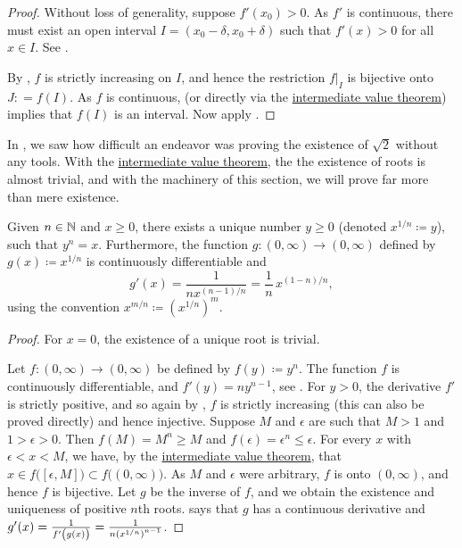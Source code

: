 \begin{proof}
Without loss of generality, suppose $f'(x_0) > 0$.  As $f'$ is
continuous, there must exist an open interval $I = (x_0-\delta,x_0+\delta)$ 
such that $f'(x) > 0$ for all $x \in I$.  See
.

By , $f$ is strictly increasing
on $I$, and hence the restriction $f|_{I}$ is bijective onto $J: = f(I)$.
As $f$ is continuous,
(or directly via the
\hyperref[IVT:thm]{intermediate value theorem})
implies that
$f(I)$ is an interval.
Now apply .
\end{proof}

In , we saw how difficult an
endeavor was proving the existence of $\sqrt{2}$ without any
tools.
With the \hyperref[IVT:thm]{intermediate value theorem},
the the existence of roots is almost trivial, and
with the machinery of this section, we will prove
far more than mere existence.

\begin{cor}
Given $n \in {\mathbb{N}}$ and $x \geq 0$, there exists a unique 
number $y \geq 0$ (denoted $x^{1/n} \coloneqq y$), such that $y^n = x$.  Furthermore,
the function $g \colon (0,\infty) \to (0,\infty)$ defined by
$g(x) \coloneqq x^{1/n}$ is continuously differentiable and
\begin{equation*}
g'(x) = \frac{1}{nx^{(n-1)/n}} = \frac{1}{n} \, x^{(1-n)/n} ,
\end{equation*}
using the convention $x^{m/n} \coloneqq {(x^{1/n})}^{m}$.
\end{cor}

\begin{proof}
For $x=0$, the existence of a unique root is trivial.

Let $f \colon (0,\infty) \to (0,\infty)$ be defined by $f(y) \coloneqq y^n$.
The function $f$ is continuously differentiable,
and $f'(y) = ny^{n-1}$, see .
For $y > 0$, the derivative $f'$ is strictly positive,
and so again by , $f$ is strictly
increasing (this can also be proved directly) and hence injective.
Suppose $M$ and $\epsilon$ are such that
$M > 1$ and $1 > \epsilon > 0$.
Then
$f(M) = M^n \geq M$ and
$f(\epsilon) = \epsilon^n \leq \epsilon$.
For every $x$ with $\epsilon < x < M$,
we have, by the
\hyperref[IVT:thm]{intermediate value theorem}, that $x \in
f\bigl( [\epsilon,M] \bigr) \subset
f\bigl( (0,\infty) \bigr)$.  As $M$ and $\epsilon$ were arbitrary, $f$ is onto
$(0,\infty)$, and hence $f$ is bijective.
Let $g$ be the inverse of $f$, and we obtain
the existence and uniqueness of positive
$n$th roots.   says that $g$ has a continuous
derivative and $g'(x) =
\frac{1}{f'\left(\vphantom{1^1_1}g(x)\right)} = \frac{1}{n {(x^{1/n})}^{n-1}}$.
\end{proof}

